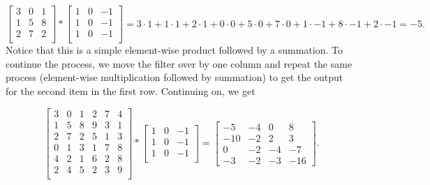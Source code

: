\documentclass[12pt]{article}
\begin{document}
\begin{equation*}   
  \begin{bmatrix}     
    3 & 0 & 1 \\
    1 & 5 & 8 \\     
    2 & 7 & 2 \\     
  \end{bmatrix} 
  *
  \begin{bmatrix}     
    1 & 0 & -1 \\     
    1 & 0 & -1 \\
    1 & 0 & -1 \\
  \end{bmatrix}
  = 3\cdot 1 + 1 \cdot 1 + 2\cdot 1 + 0\cdot 0 + 5 \cdot 0 + 7 \cdot 0 + 1 \cdot -1 + 8 \cdot -1 + 2 \cdot -1 = -5.
\end{equation*}
Notice that this is a simple element-wise product followed by a summation. To continue the process, we move the filter
over by one column and repeat the same process (element-wise multiplication followed by summation) 
to get the output for the second item in the first row. Continuing on, we get

\begin{equation*}   
  \begin{bmatrix}     
    3 & 0 & 1 & 2 & 7 & 4 \\
    1 & 5 & 8 & 9 & 3 & 1 \\     
    2 & 7 & 2 & 5 & 1 & 3 \\     
    0 & 1 & 3 & 1 & 7 & 8 \\     
    4 & 2 & 1 & 6 & 2 & 8 \\     
    2 & 4 & 5 & 2 & 3 & 9 \\ 
  \end{bmatrix} 
  *
  \begin{bmatrix}     
    1 & 0 & -1 \\     
    1 & 0 & -1 \\
    1 & 0 & -1 \\
  \end{bmatrix}
  = \begin{bmatrix}     -5 & -4 & 0 & 8 \\
    -10 & -2 & 2 & 3 \\
    0 & -2 & -4 & -7 \\
    -3 & -2 & -3 & -16   \end{bmatrix}.
\end{equation*}
\end{document}
